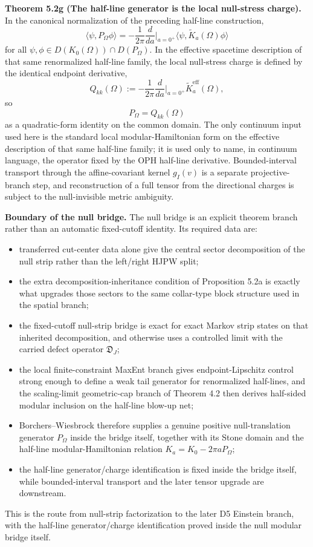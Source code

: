 \textbf{Theorem 5.2g (The half-line generator is the local null-stress charge).} In the canonical normalization of the preceding half-line construction,
\[
\langle\psi,P_\Omega\phi\rangle
=
-\frac{1}{2\pi}\frac{d}{da}\Big|_{a=0^+}
\langle\psi,\widetilde K_a(\Omega)\phi\rangle
\]
for all \(\psi,\phi\in D(K_0(\Omega))\cap D(P_\Omega)\). In the effective spacetime description of that same renormalized half-line family, the local null-stress charge is defined by the identical endpoint derivative,
\[
Q_{kk}(\Omega)
:=
-\frac{1}{2\pi}\frac{d}{da}\Big|_{a=0^+}\widetilde K^{\mathrm{eff}}_a(\Omega),
\]
so
\[
P_\Omega = Q_{kk}(\Omega)
\]
as a quadratic-form identity on the common domain. The only continuum input used here is the standard local modular-Hamiltonian form on the effective description of that same half-line family; it is used only to name, in continuum language, the operator fixed by the OPH half-line derivative. Bounded-interval transport through the affine-covariant kernel \(g_I(v)\) is a separate projective-branch step, and reconstruction of a full tensor from the directional charges is subject to the null-invisible metric ambiguity.

\textbf{Boundary of the null bridge.} The null bridge is an explicit theorem branch rather than an automatic fixed-cutoff identity. Its required data are:
\begin{itemize}
\tightlist
\item
  transferred cut-center data alone give the central sector decomposition of the null strip rather than the left/right HJPW split;
\item
  the extra decomposition-inheritance condition of Proposition 5.2a is exactly what upgrades those sectors to the same collar-type block structure used in the spatial branch;
\item
  the fixed-cutoff null-strip bridge is exact for exact Markov strip states on that inherited decomposition, and otherwise uses a controlled limit with the carried defect operator \(\mathfrak D_J\);
\item
  the local finite-constraint MaxEnt branch gives endpoint-Lipschitz control strong enough to define a weak tail generator for renormalized half-lines, and the scaling-limit geometric-cap branch of Theorem 4.2 then derives half-sided modular inclusion on the half-line blow-up net;
\item
  Borchers--Wiesbrock therefore supplies a genuine positive null-translation generator \(P_\Omega\) inside the bridge itself, together with its Stone domain and the half-line modular-Hamiltonian relation \(K_a=K_0-2\pi aP_\Omega\);
\item
  the half-line generator/charge identification is fixed inside the bridge itself, while bounded-interval transport and the later tensor upgrade are downstream.
\end{itemize}
This is the route from null-strip factorization to the later D5 Einstein branch, with the half-line generator/charge identification proved inside the null modular bridge itself.
